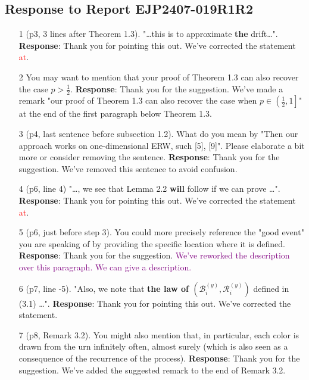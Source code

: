 \documentclass[11pt,a4paper]{article}
\numberwithin{equation}{section}
\newcommand{\edt}[1]{\textcolor{purple}{#1}} %
\def\TBF#1{\textcolor{red}{#1}} %
\begin{document}
	\subsection*{Response to Report EJP2407-019R1R2}
	\begin{itemize}
		\item[1] (p3, 3 lines after Theorem 1.3). "\dots this is to approximate \textbf{the} drift\dots".
		\subitem \textbf{Response}:  Thank you for pointing this out.  We've corrected the statement \TBF{at}.
		
		
		\item[2] You may want to mention that your proof of Theorem 1.3 can also recover the case $p > \frac{1}{2}$.
		\subitem \textbf{Response}:  Thank you for the suggestion. We've made a remark "our proof of Theorem 1.3 can also recover the case when $p \in \left(\frac{1}{2}, 1\right] $" at the end of the first paragraph below Theorem 1.3.
		
		
		\item[3] (p4, last sentence before subsection 1.2). What do you mean by "Then our approach works on one-dimensional ERW, such [5], [9]". Please elaborate a bit more or consider removing the sentence.
		\subitem \textbf{Response}: Thank you for the suggestion. We've removed this sentence to avoid confusion. 
		
		
		\item[4] (p6, line 4) "\dots , we see that Lemma 2.2 \textbf{will} follow if we can prove \dots".
		\subitem \textbf{Response}:  Thank you for pointing this out.  We've corrected the statement \TBF{at}.
		
		
		\item[5] (p6, just before step 3). You could more precisely reference the "good event" you are	speaking of by providing the specific location where it is defined.
		\subitem \textbf{Response}: Thank you for the suggestion. \edt{We've reworked the description over this paragraph. We can give a description.}
		
		\item[6](p7, line -5). "Also, we note that \textbf{the law of $\left(\mathcal{B}_i^{(y)}
			,\mathcal{R}_i^{(y)} \right)$} defined in (3.1) \dots ".
		\subitem \textbf{Response}:  Thank you for pointing this out.  We've corrected the statement.
		
		
		\item[7] (p8, Remark 3.2). You might also mention that, in particular, each color is drawn from the
		urn infinitely often, almost surely (which is also seen as a consequence of the recurrence of
		the process).
		\subitem \textbf{Response}:  Thank you for the suggestion. We've added the suggested remark to the end of Remark 3.2.
		

\end{itemize}
\end{document}
